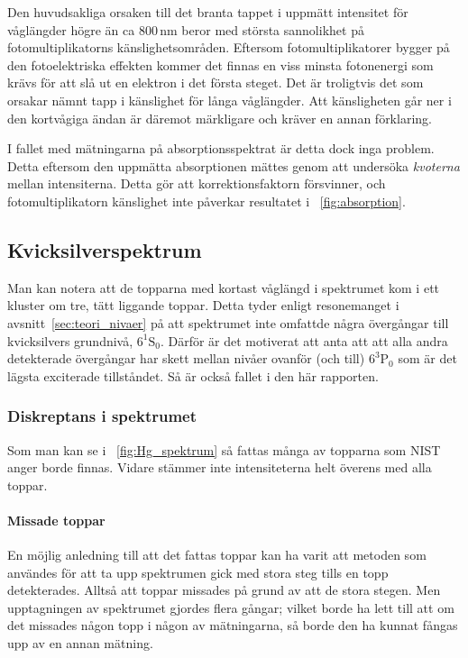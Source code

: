 \documentclass[11pt,a4paper]{article}
\newcommand{\figref}{\figurename~\ref}
\begin{document}
Den huvudsakliga orsaken till det branta tappet i uppmätt intensitet
för våglängder högre än ca 800\,nm beror med största sannolikhet på
fotomultiplikatorns känslighetsområden. Eftersom fotomultiplikatorer
bygger på den fotoelektriska effekten kommer det finnas en viss minsta
fotonenergi som krävs för att slå ut en elektron i det första
steget. Det är troligtvis det som orsakar nämnt tapp i
känslighet för långa våglängder. Att känsligheten går ner i den
kortvågiga ändan är däremot märkligare och kräver en annan
förklaring. 

I fallet med mätningarna på absorptionsspektrat är detta dock inga
problem. Detta eftersom den uppmätta absorptionen mättes genom att
undersöka \emph{kvoterna} mellan intensiterna. Detta gör att
korrektionsfaktorn försvinner, och fotomultiplikatorn känslighet inte
påverkar resultatet i \figref{fig:absorption}.


\subsection{Kvicksilverspektrum}
Man kan notera att de topparna med kortast våglängd i spektrumet kom i
ett kluster om tre, tätt liggande toppar. Detta tyder enligt
resonemanget i avsnitt~\ref{sec:teori_nivaer} på att spektrumet inte
omfattde några övergångar till kvicksilvers grundnivå,
$6^1\mathrm{S}_0$. Därför är det motiverat att anta att att alla andra
detekterade övergångar har skett mellan nivåer ovanför (och till)
$6^3\mathrm{P}_0$ som är det lägsta exciterade tillståndet. Så är
också fallet i den här rapporten.

\subsubsection{Diskreptans i spektrumet}
Som man kan se i \figref{fig:Hg_spektrum} så fattas många av topparna
som NIST \cite{NIST_spectrum} anger borde finnas. Vidare stämmer inte
intensiteterna helt överens med alla toppar. 

\paragraph{Missade toppar}
En möjlig anledning till att det fattas toppar kan ha varit att
metoden som användes för att ta upp spektrumen gick med stora steg
tills en topp detekterades. Alltså att toppar missades på grund av att
de stora stegen. Men upptagningen av spektrumet gjordes flera
gångar; vilket borde ha lett till att om det missades någon topp i
någon av mätningarna, så borde den ha kunnat fångas upp av en annan
mätning. 
\end{document}
